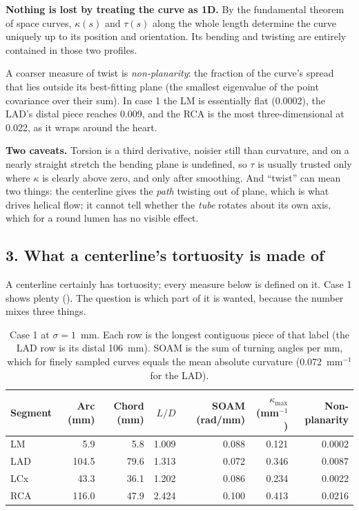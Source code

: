 \textbf{Nothing is lost by treating the curve as 1D.} By the fundamental theorem of space curves,
$\kappa(s)$ and $\tau(s)$ along the whole length determine the curve uniquely up to its position
and orientation. Its bending and twisting are entirely contained in those two profiles.

A coarser measure of twist is \emph{non-planarity}: the fraction of the curve's spread that lies
outside its best-fitting plane (the smallest eigenvalue of the point covariance over their sum).
In case 1 the LM is essentially flat (0.0002), the LAD's distal piece reaches 0.009, and the RCA is
the most three-dimensional at 0.022, as it wraps around the heart.

\textbf{Two caveats.} Torsion is a third derivative, noisier still than curvature, and on a nearly straight
stretch the bending plane is undefined, so $\tau$ is usually trusted only where $\kappa$ is clearly
above zero, and only after smoothing. And ``twist'' can mean two things: the centerline gives the
\emph{path} twisting out of plane, which is what drives helical flow; it cannot tell whether the
\emph{tube} rotates about its own axis, which for a round lumen has no visible effect.

\subsection*{3. What a centerline's tortuosity is made of}

A centerline certainly has tortuosity; every measure below is defined on it. Case 1 shows plenty
(). The question is which part of it is wanted, because the number mixes
three things.

\begin{table}[htbp]
  \centering
  \small
  \begin{tabular}{@{}lrrrrrr@{}}
    \toprule
    Segment & Arc (mm) & Chord (mm) & $L/D$ & SOAM (rad/mm) & $\kappa_{\max}$ (mm$^{-1}$) &
    Non-planarity \\
    \midrule
    LM  &   5.9 &  5.8 & 1.009 & 0.088 & 0.121 & 0.0002 \\
    LAD & 104.5 & 79.6 & 1.313 & 0.072 & 0.346 & 0.0087 \\
    LCx &  43.3 & 36.1 & 1.202 & 0.086 & 0.234 & 0.0022 \\
    RCA & 116.0 & 47.9 & 2.424 & 0.100 & 0.413 & 0.0216 \\
    \bottomrule
  \end{tabular}
  \caption{Case 1 at $\sigma = 1$~mm. Each row is the longest contiguous piece of that label
    (the LAD row is its distal 106~mm). SOAM is the sum of turning angles per mm, which for
    finely sampled curves equals the mean absolute curvature (0.072~mm$^{-1}$ for the LAD).}
  \label{tab:week3-case1}
\end{table}

